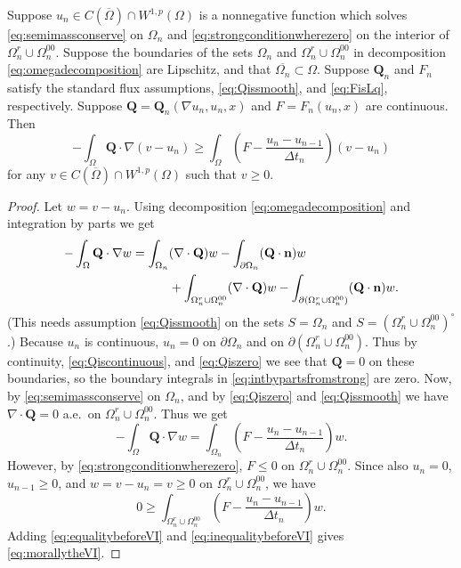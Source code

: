 \documentclass[final,onefignum]{siamart190516}
\newcommand\bn{\mathbf{n}}
\newcommand\bQ{\mathbf{Q}}
\newcommand{\Div}{\nabla\cdot}
\newcommand{\grad}{\nabla}
\begin{document}
\begin{theorem} \label{thm:strongimpliesweak}  Suppose $u_n \in C(\overline{\Omega}) \cap W^{1,p}(\Omega)$ is a nonnegative function which solves \eqref{eq:semimassconserve} on $\Omega_n$ and \eqref{eq:strongconditionwherezero} on the interior of $\Omega_n^r \cup \Omega_n^{00}$.  Suppose the boundaries of the sets $\Omega_n$ and $\Omega_n^r \cup \Omega_n^{00}$ in decomposition \eqref{eq:omegadecomposition} are Lipschitz, and that $\overline{\Omega_n} \subset \Omega$.  Suppose $\bQ_n$ and $F_n$ satisfy the standard flux assumptions, \eqref{eq:Qissmooth}, and \eqref{eq:FisLq}, respectively.  Suppose $\bQ = \bQ_n(\grad u_n,u_n,x)$ and $F=F_n(u_n,x)$ are continuous.  Then
\begin{equation}
-\int_{\Omega} \bQ \cdot \grad(v-u_n) \ge \int_{\Omega} \left(F - \frac{u_n - u_{n-1}}{\Delta t_n}\right) (v-u_n) \label{eq:morallytheVI}
\end{equation}
for any $v \in C(\overline{\Omega}) \cap W^{1,p}(\Omega)$ such that $v \ge 0$.
\end{theorem}

\begin{proof}  Let $w=v-u_n$.  Using decomposition \eqref{eq:omegadecomposition} and integration by parts we get
\begin{align}
-\int_{\Omega} \bQ \cdot \grad w &= \int_{\Omega_n} (\Div \bQ) w - \int_{\partial \Omega_n} (\bQ \cdot \bn) w \label{eq:intbypartsfromstrong} \\
  &\qquad\quad + \int_{\Omega_n^r \cup \Omega_n^{00}} (\Div \bQ) w - \int_{\partial(\Omega_n^r \cup \Omega_n^{00})} (\bQ \cdot \bn) w. \notag
\end{align}
(This needs assumption \eqref{eq:Qissmooth} on the sets $S=\Omega_n$ and $S=(\Omega_n^r \cup \Omega_n^{00})^\circ$.)  Because $u_n$ is continuous, $u_n=0$ on $\partial \Omega_n$ and on $\partial(\Omega_n^r \cup \Omega_n^{00})$.  Thus by continuity, \eqref{eq:Qiscontinuous}, and \eqref{eq:Qiszero} we see that $\bQ=0$ on these boundaries, so the boundary integrals in \eqref{eq:intbypartsfromstrong} are zero.  Now, by \eqref{eq:semimassconserve} on $\Omega_n$, and by \eqref{eq:Qiszero} and \eqref{eq:Qissmooth} we have $\Div \bQ=0$ a.e.~on $\Omega_n^r \cup \Omega_n^{00}$.  Thus we get
\begin{equation}
-\int_{\Omega} \bQ \cdot \grad w = \int_{\Omega_n} \left(F - \frac{u_n - u_{n-1}}{\Delta t_n}\right) w. \label{eq:equalitybeforeVI}
\end{equation}
However, by \eqref{eq:strongconditionwherezero}, $F \le 0$ on $\Omega_n^r \cup \Omega_n^{00}$.  Since also $u_n=0$, $u_{n-1}\ge 0$, and $w = v-u_n = v \ge 0$ on $\Omega_n^r \cup \Omega_n^{00}$, we have
\begin{equation}
    0 \ge \int_{\Omega_n^r \cup \Omega_n^{00}} \left(F - \frac{u_n - u_{n-1}}{\Delta t_n}\right) w. \label{eq:inequalitybeforeVI}
\end{equation}
Adding \eqref{eq:equalitybeforeVI} and \eqref{eq:inequalitybeforeVI} gives \eqref{eq:morallytheVI}.
\end{proof}
\end{document}
